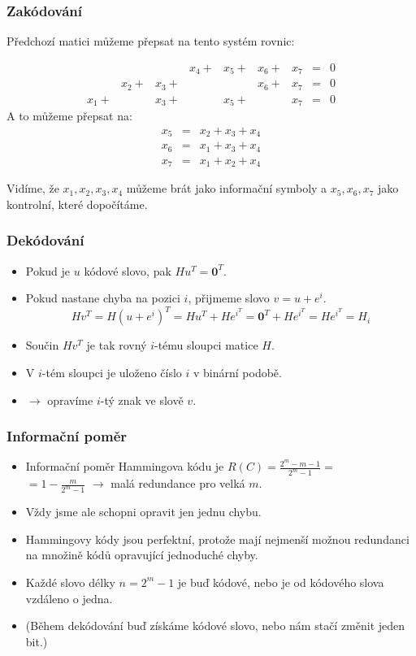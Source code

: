 \documentclass{beamer}
\newcommand{\zero}{\textbf{0}}
\newenvironment{itemizex}%
  {\large \begin{itemize}%
    \setlength{\itemsep}{8pt}%
    \setlength{\parskip}{8pt}}%
  {\end{itemize}}
\newenvironment{itemizey}%
  {\large \begin{itemize}%
    \setlength{\itemsep}{6pt}%
    \setlength{\parskip}{6pt}}%
  {\end{itemize}}
\begin{document}
\begin{frame}[t,fragile]\frametitle{Zakódování} 
Předchozí matici můžeme přepsat na tento systém rovnic:

$$
\begin{array}{ccccccccc}
&&&x_4+&x_5+&x_6+&x_7&=&0\\
&x_2+&x_3+&&&x_6+&x_7&=&0\\
x_1+&&x_3+&&x_5+&&x_7&=&0
\end{array}
$$
A to můžeme přepsat na:
\begin{eqnarray*}
x_5&=&x_2+x_3+x_4\\
x_6&=&x_1+x_3+x_4\\
x_7&=&x_1+x_2+x_4
\end{eqnarray*}

Vidíme, že $x_1, x_2, x_3, x_4$ můžeme brát jako informační symboly a $x_5, x_6, x_7$ jako kontrolní, které dopočítáme. 
\end{frame}



\begin{frame}[t,fragile]\frametitle{Dekódování} 
    \begin{itemizex}
        \item Pokud je $u$ kódové slovo, pak $Hu^T=\zero^T$. 
        \item Pokud nastane chyba na pozici $i$, přijmeme slovo $v=u+e^i$.
$$
Hv^T=H(u+e^i)^T=Hu^T+He^{i^T}=\zero^T+He^{i^T}=He^{i^T}=H_i
$$
        \item Součin $Hv^T$ je tak rovný $i$-tému sloupci matice $H$.
        \item V $i$-tém sloupci je uloženo číslo $i$ v binární podobě.
        \item $\longrightarrow$ opravíme $i$-tý znak ve slově $v$.
    \end{itemizex}
\end{frame}



\begin{frame}[t,fragile]\frametitle{Informační poměr} 
    \begin{itemizey}
        \item Informační poměr Hammingova kódu je $R(C)=\frac{2^m-m-1}{2^m-1}=$\\$=1-\frac{m}{2^m-1}$ $\longrightarrow$ malá redundance pro velká $m$.
        \item Vždy jsme ale schopni opravit jen jednu chybu.
        \item Hammingovy kódy jsou perfektní, protože mají nejmenší možnou redundanci na množině kódů opravující jednoduché chyby.
        \item Každé slovo délky $n=2^m-1$ je buď kódové, nebo je od kódového slova vzdáleno o jedna.
        \item (Během dekódování buď získáme kódové slovo, nebo nám stačí změnit jeden bit.)
    \end{itemizey}
\end{frame}
\end{document}
